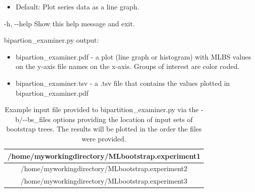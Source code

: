 \documentclass{article}
\begin{document}
\begin{description}
\begin{description}
\begin{description}
                    \begin{itemize}
                        \item Default: Plot series data as a line graph.
                    \end{itemize}
                    \item -h, -\/-help \hspace{0.2cm} Show this help message and exit.
                \end{description}
            \end{description}
            \vspace{0.2cm}
            \begin{description}
                \item bipartion\_examiner.py output:
                \begin{itemize}
                    \item bipartion\_examiner.pdf  - a plot (line graph or histogram) with MLBS values on the y-axis file names on the x-axis. Groups of interest are color coded.
                    \item bipartion\_examiner.tsv - a .tsv file that contains the values plotted in bipartion\_examiner.pdf
                \end{itemize}
            \end{description}
        \end{description}
  
        \vspace{0.2cm}

        \begin{center}
        \begin{table}[H]
        \centering
        \begin{tabular}{ |c| } 
        \hline
        /home/myworkingdirectory/MLbootstrap.experiment1 \\
        \hline
        /home/myworkingdirectory/MLbootstrap.experiment2 \\
        \hline
        /home/myworkingdirectory/MLbootstrap.experiment3 \\
        \hline
        \end{tabular}
        \captionsetup{width=.89\textwidth}
        \caption{Example input file provided to bipartition\_examiner.py via the -b/-\/-bs\_files options providing the location of input sets of bootstrap trees. The results will be plotted in the order the files were provided.}
        \label{Tab:bsfiles}
        \end{table}
        \end{center}
    
\end{document}
